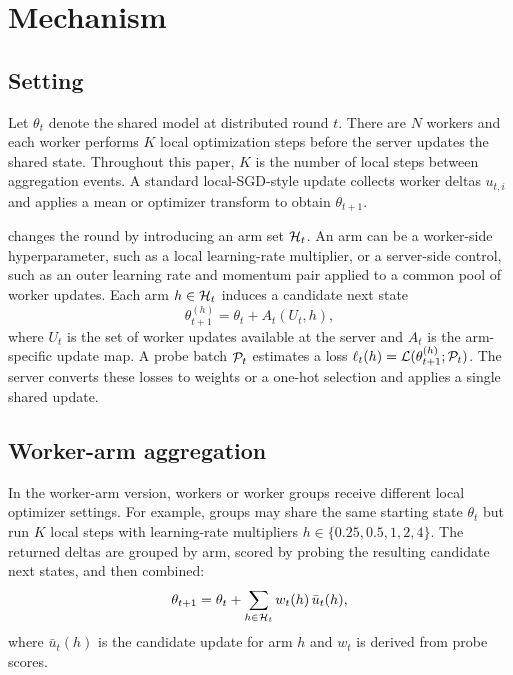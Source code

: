 \section{Mechanism}
\label{sec:method}

\subsection{Setting}

Let $\theta_t$ denote the shared model at distributed round $t$. There are $N$
workers and each worker performs $K$ local optimization steps before the server
updates the shared state. Throughout this paper, $K$ is the number of local
steps between aggregation events. A standard local-SGD-style update collects
worker deltas $u_{t,i}$ and applies a mean or optimizer transform to obtain
$\theta_{t+1}$.

\method changes the round by introducing an arm set $\mathcal{H}_t$. An arm can be a
worker-side hyperparameter, such as a local learning-rate multiplier, or a
server-side control, such as an outer learning rate and momentum pair applied
to a common pool of worker updates. Each arm $h \in \mathcal{H}_t$ induces a candidate
next state
\begin{equation}
\theta_{t+1}^{(h)} = \theta_t + A_t(U_t, h),
\end{equation}
where $U_t$ is the set of worker updates available at the server and $A_t$ is
the arm-specific update map. A probe batch $\mathcal{P}_t$ estimates a loss
$\ell_t(h)=\mathcal{L}(\theta_{t+1}^{(h)}; \mathcal{P}_t)$. The server converts these losses
to weights or a one-hot selection and applies a single shared update.

\subsection{Worker-arm aggregation}

In the worker-arm version, workers or worker groups receive different local
optimizer settings. For example, groups may share the same starting state
$\theta_t$ but run $K$ local steps with learning-rate multipliers
$h \in \{0.25,0.5,1,2,4\}$. The returned deltas are grouped by arm, scored by
probing the resulting candidate next states, and then combined:
\begin{equation}
\theta_{t+1} = \theta_t + \sum_{h \in \mathcal{H}_t} w_t(h)\,\bar{u}_t(h),
\end{equation}
where $\bar{u}_t(h)$ is the candidate update for arm $h$ and $w_t$ is derived
from probe scores.


